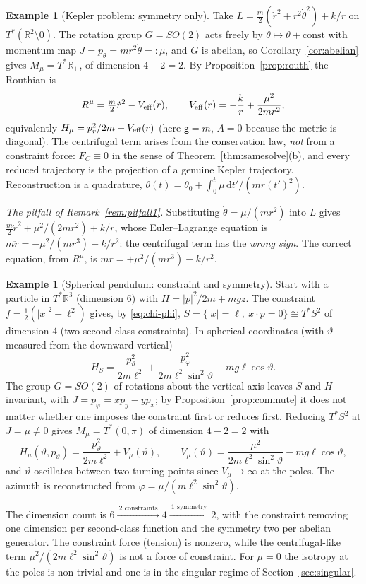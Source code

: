 \documentclass[11pt,a4paper]{article}
\numberwithin{equation}{section}
\theoremstyle{plain}
\theoremstyle{definition}
\newtheorem{example}[theorem]{Example}
\theoremstyle{remark}
\newcommand{\R}{\mathbb{R}}
\newcommand{\dd}{\mathrm{d}}
\begin{document}
\begin{example}[Kepler problem: symmetry only]\label{ex:kepler}
Take $L=\tfrac m2(\dot r^2+r^2\dot\theta^2)+k/r$ on $T^*(\R^2\setminus0)$. The rotation group $G=SO(2)$ acts freely by $\theta\mapsto\theta+\text{const}$ with momentum map $J=p_\theta=mr^2\dot\theta=:\mu$, and $G$ is abelian, so Corollary~\ref{cor:abelian} gives $M_\mu=T^*\R_+$, of dimension $4-2=2$. By Proposition~\ref{prop:routh} the Routhian is
\[
R^\mu=\tfrac m2\dot r^2-V_{\rm eff}(r),\qquad V_{\rm eff}(r)=-\frac kr+\frac{\mu^2}{2mr^2},
\]
equivalently $H_\mu=p_r^2/2m+V_{\rm eff}(r)$ (here $\mathsf g=m$, $A=0$ because the metric is diagonal). The centrifugal term arises from the conservation law, \emph{not} from a constraint force: $F_C\equiv0$ in the sense of Theorem~\ref{thm:samesolve}(b), and every reduced trajectory is the projection of a genuine Kepler trajectory. Reconstruction is a quadrature, $\theta(t)=\theta_0+\int_0^t\mu\,\dd t'/(mr(t')^2)$.

\emph{The pitfall of Remark~\ref{rem:pitfall1}.} Substituting $\dot\theta=\mu/(mr^2)$ into $L$ gives $\tfrac m2\dot r^2+\mu^2/(2mr^2)+k/r$, whose Euler--Lagrange equation is $m\ddot r=-\mu^2/(mr^3)-k/r^2$: the centrifugal term has the \emph{wrong sign}. The correct equation, from $R^\mu$, is $m\ddot r=+\mu^2/(mr^3)-k/r^2$.
\end{example}

\begin{example}[Spherical pendulum: constraint and symmetry]\label{ex:sphpend}
Start with a particle in $T^*\R^3$ (dimension $6$) with $H=|p|^2/2m+mgz$. The constraint $f=\tfrac12(|x|^2-\ell^2)$ gives, by \eqref{eq:chi-phi}, $S=\{|x|=\ell,\ x\cdot p=0\}\cong T^*S^2$ of dimension $4$ (two second-class constraints). In spherical coordinates (with $\vartheta$ measured from the downward vertical)
\[
H_S=\frac{p_\vartheta^2}{2m\ell^2}+\frac{p_\varphi^2}{2m\ell^2\sin^2\vartheta}-mg\ell\cos\vartheta .
\]
The group $G=SO(2)$ of rotations about the vertical axis leaves $S$ and $H$ invariant, with $J=p_\varphi=xp_y-yp_x$; by Proposition~\ref{prop:commute} it does not matter whether one imposes the constraint first or reduces first. Reducing $T^*S^2$ at $J=\mu\ne0$ gives $M_\mu=T^*(0,\pi)$ of dimension $4-2=2$ with
\[
H_\mu(\vartheta,p_\vartheta)=\frac{p_\vartheta^2}{2m\ell^2}+V_\mu(\vartheta),\qquad V_\mu(\vartheta)=\frac{\mu^2}{2m\ell^2\sin^2\vartheta}-mg\ell\cos\vartheta,
\]
and $\vartheta$ oscillates between two turning points since $V_\mu\to\infty$ at the poles. The azimuth is reconstructed from $\dot\varphi=\mu/(m\ell^2\sin^2\vartheta)$.

The dimension count is $6\xrightarrow{\ 2\text{ constraints}\ }4\xrightarrow{\ 1\text{ symmetry}\ }2$, with the constraint removing one dimension per second-class function and the symmetry two per abelian generator. The constraint force (tension) is nonzero, while the centrifugal-like term $\mu^2/(2m\ell^2\sin^2\vartheta)$ is not a force of constraint. For $\mu=0$ the isotropy at the poles is non-trivial and one is in the singular regime of Section~\ref{sec:singular}.
\end{example}
\end{document}
